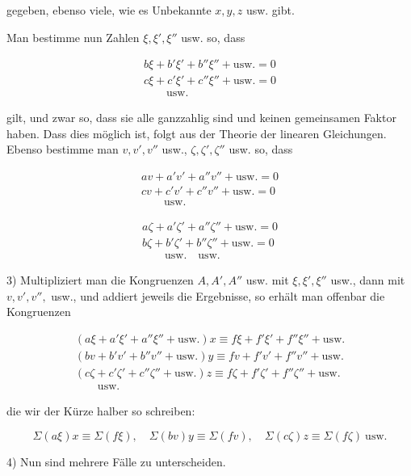 gegeben, ebenso viele, wie es Unbekannte $x,y,z$ usw. gibt.

Man bestimme nun Zahlen $\xi,\xi',\xi''$ usw. so, dass

\[\begin{array}{l}
b\xi+b'\xi'+b''\xi''+\mathrm{usw.}=0\\
c\xi+c'\xi'+c''\xi''+\mathrm{usw.}=0\\
\qquad\mathrm{usw.}
\end{array}\]

gilt, und zwar so, dass sie alle ganzzahlig sind und keinen gemeinsamen Faktor haben. Dass dies möglich ist, folgt aus der Theorie der linearen Gleichungen. Ebenso bestimme man $v,v',v''$ usw., $\zeta,\zeta',\zeta''$ usw. so, dass

\[
\begin{array}{l}av+a'v'+a''v''+\mathrm{usw.}=0\\cv+c'v'+c''v''+\mathrm{usw.}=0\\\qquad\mathrm{usw.}\end{array}
\]

\[\begin{array}{l}
a\zeta+a'\zeta'+a''\zeta''+\mathrm{usw.}=0\\
b\zeta+b'\zeta'+b''\zeta''+\mathrm{usw.}=0\\
\qquad\mathrm{usw.}\quad\mathrm{usw.}
\end{array}\]

3) Multipliziert man die Kongruenzen $A,A',A''$ usw. mit $\xi,\xi',\xi''$ usw., dann mit $v,v',v'',$ usw., und addiert jeweils die Ergebnisse, so erhält man offenbar die Kongruenzen

\[
\begin{array}{l}(a\xi+a'\xi'+a''\xi''+\mathrm{usw.})x\equiv f\xi+f'\xi'+f''\xi''+\mathrm{usw.}\\(bv+b'v'+b''v''+\mathrm{usw.})y\equiv fv+f'v'+f''v''+\mathrm{usw.}\\(c\zeta+c'\zeta'+c''\zeta''+\mathrm{usw.})z\equiv f\zeta+f'\zeta'+f''\zeta''+\mathrm{usw.}\\\qquad\mathrm{usw.}\end{array}
\]

die wir der Kürze halber so schreiben:

\[
\Sigma(a\xi)x\equiv\Sigma(f\xi),\quad\Sigma(bv)y\equiv\Sigma(fv),\quad\Sigma(c\zeta)z\equiv\Sigma(f\zeta)\ \mathrm{usw.}
\]

4) Nun sind mehrere Fälle zu unterscheiden.

